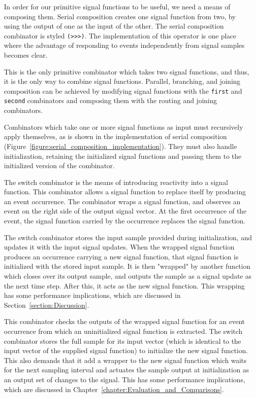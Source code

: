 In order for our primitive signal functions to be useful, we need a means of
composing them. Serial composition creates one signal function from two, by
using the output of one as the input of the other. The serial composition
combinator is styled {\tt (>>>)}. The implementation of this operator is one
place where the advantage of responding to events independently from signal
samples becomes clear. 

This is the only primitive combinator which takes two signal functions, and
thus, it is the only way to combine signal functions. Parallel, branching, and
joining composition can be achieved by modifying signal functions with the
{\tt first} and {\tt second} combinators and composing them with the
routing and joining combinators.

Combinators which take one or more signal functions as input must recursively
apply themselves, as is shown in the implementation of serial composition
(Figure~\ref{figure:serial_composition_implementation}). They must also
handle initialization, retaining the initialized signal functions and passing
them to the initialized version of the combinator.

The switch combinator is the means of introducing reactivity into a signal
function. This combinator allows a signal function to replace itself by
producing an event occurrence. The combinator wraps a signal function, and 
observes an event on the right side of the output signal vector. At the first
occurrence of the event, the signal function carried by the occurrence replaces
the signal function. 

The switch combinator stores the input sample provided during initialization,
and updates it with the input signal updates. When the wrapped signal function
produces an occurrence carrying a new signal function, that signal function is
initialized with the stored input sample. It is then "wrapped" by another
function which closes over its output sample, and outputs the sample as a signal
update as the next time step. After this, it acts as the new signal function.
This wrapping has some performance implications, which are discussed in Section~\ref{section:Discussion}.

This combinator checks the outputs of the wrapped
signal function for an event occurrence from which an uninitialized signal
function is extracted. The switch combinator stores the full sample
for its input vector (which is identical to the input vector of the supplied
signal function) to initialize the new signal function. This also demands that
it add a wrapper to the new signal function which waits for the next sampling
interval and actuates the sample output at initialization as an output set
of changes to the signal. This has some performance implications, which are
discussed in Chapter~\ref{chapter:Evaluation_and_Comparisons}.

